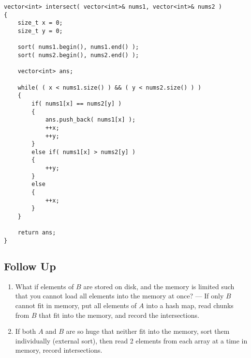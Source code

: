 \setcounter{lstlisting}{0}
\begin{lstlisting}[style=customc, caption={Sorting}]
vector<int> intersect( vector<int>& nums1, vector<int>& nums2 )
{
    size_t x = 0;
    size_t y = 0;

    sort( nums1.begin(), nums1.end() );
    sort( nums2.begin(), nums2.end() );

    vector<int> ans;

    while( ( x < nums1.size() ) && ( y < nums2.size() ) )
    {
        if( nums1[x] == nums2[y] )
        {
            ans.push_back( nums1[x] );
            ++x;
            ++y;
        }
        else if( nums1[x] > nums2[y] )
        {
            ++y;
        }
        else
        {
            ++x;
        }
    }

    return ans;
}
\end{lstlisting}

\subsection{Follow Up}
\begin{enumerate}
\item What if elements of $B$ are stored on disk, and the memory is
limited such that you cannot load all elements into the memory at
once? --- If only $B$ cannot fit in memory, put all elements of $A$ into a hash map, read chunks from $B$ that fit into the memory, and record the intersections.
\item If both $ A $ and $ B $ are so huge that neither fit into the memory, sort them individually (external sort), then read 2 elements from each array at a time in memory, record intersections.
\end{enumerate}